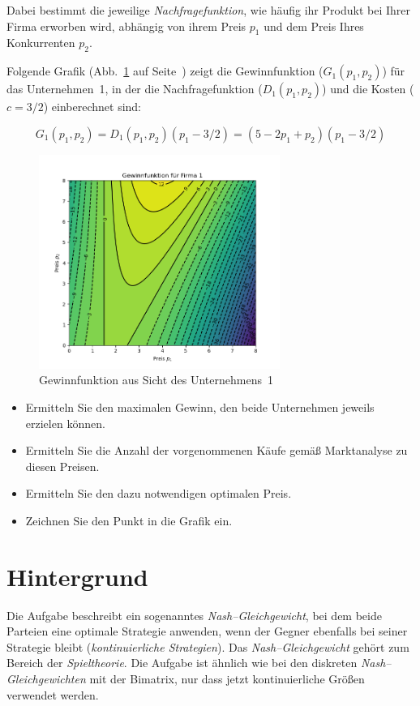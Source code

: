 \documentclass[paper=a4,notitlepage,parskip=half,plainheadsepline]{scrartcl}
\begin{document}
Dabei bestimmt die jeweilige \emph{Nachfragefunktion}, wie häufig ihr Produkt bei Ihrer Firma erworben wird, abhängig von ihrem Preis $p_1$ und dem Preis Ihres Konkurrenten $p_2$.

Folgende Grafik (Abb.~\ref{fig:Gewinnfunktion} auf Seite~\pageref{fig:Gewinnfunktion}) zeigt die Gewinnfunktion ($G_1(p_1,p_2)$) für das Unternehmen~1, in der die Nachfragefunktion \linebreak[3] ($D_1(p_1,p_2)$) und die Kosten ($c=3/2$) einberechnet sind:

\begin{equation}
G_1(p_1,p_2) = D_1(p_1,p_2) (p_1 - 3/2) = (5 - 2 p_1 + p_2) (p_1-3/2) 
\end{equation}

\begin{figure}
\begin{center}
\includegraphics[width=0.7\textwidth]{nash2.png}
\end{center}
\caption{Gewinnfunktion aus Sicht des Unternehmens~1}
\label{fig:Gewinnfunktion}
\end{figure}

\begin{itemize}
\item Ermitteln Sie den maximalen Gewinn, den beide Unternehmen jeweils erzielen können.
\item Ermitteln Sie die Anzahl der vorgenommenen Käufe gemäß Marktanalyse zu diesen Preisen.
\item Ermitteln Sie den dazu notwendigen optimalen Preis.
\item Zeichnen Sie den Punkt in die Grafik ein.
\end{itemize}


\section{Hintergrund}
Die Aufgabe beschreibt ein sogenanntes \emph{Nash--Gleichgewicht}, bei dem beide Parteien eine optimale Strategie anwenden, wenn der Gegner ebenfalls bei seiner Strategie bleibt (\emph{kontinuierliche Strategien}). Das \emph{Nash--Gleichgewicht} gehört zum Bereich der \emph{Spieltheorie}.
Die Aufgabe ist ähnlich wie bei den diskreten \emph{Nash--Gleichgewichten} mit der Bimatrix, nur dass jetzt kontinuierliche Größen verwendet werden.
\end{document}
